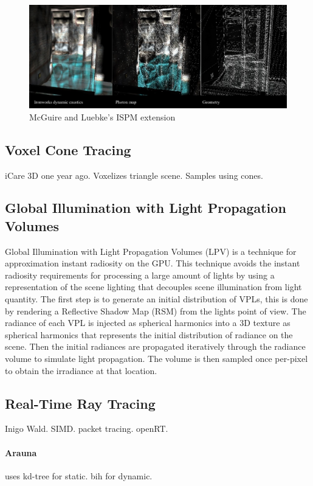 		\begin{figure}
			\centering
				\includegraphics[width=1.00\textwidth]{Media/ispm.jpg}
			\caption{McGuire and Luebke's ISPM extension}
			\label{fig:ispm}
		\end{figure}
	
	\subsection {Voxel Cone Tracing}
		iCare 3D one year ago. Voxelizes triangle scene. Samples using cones. \cite{crassin2011}

	\subsection {Global Illumination with Light Propagation Volumes}

	Global Illumination with Light Propagation Volumes (LPV) is a technique for approximation instant radiosity on the GPU. \cite{kaplanyan2009} This technique avoids the instant radiosity requirements for processing a large amount of lights by using a representation of the scene lighting that decouples scene illumination from light quantity. The first step is to generate an initial distribution of VPLs, this is done by rendering a Reflective Shadow Map (RSM) \cite{dachsbacher2005} from the lights point of view. The radiance of each VPL is injected as spherical harmonics into a 3D texture as spherical harmonics that represents the initial distribution of radiance on the scene. Then the initial radiances are propagated iteratively through the radiance volume to simulate light propagation. The volume is then sampled once per-pixel to obtain the irradiance at that location.

\subsection {Real-Time Ray Tracing}
	Inigo Wald. SIMD. packet tracing. openRT. 
	\paragraph{Arauna} uses kd-tree for static. bih for dynamic.

